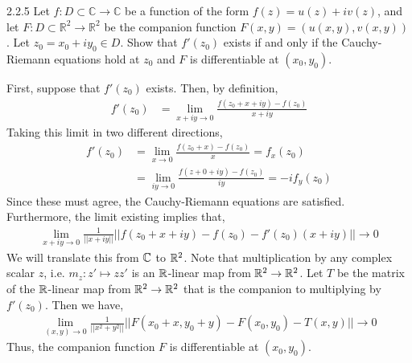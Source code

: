 \documentclass[12pt]{amsart}
\begin{document}
\begin{problem}{2.2.5}
    Let \( f : D \subset \mathbb{C} \to \mathbb{C} \) be a function of the form \( f(z) = u(z) + i v(z) \), and let \( F : D \subset \mathbb{R}^2 \to \mathbb{R}^2 \) be the companion function \( F(x,y) = (u(x,y), v(x,y)) \). Let \( z_0 = x_0 + i y_0 \in D \). Show that \( f'(z_0) \) exists if and only if the Cauchy-Riemann equations hold at \( z_0 \) and \( F \) is differentiable at \( (x_0, y_0) \).
\end{problem}
\begin{solution}
    First, suppose that $f'(z_0)$ exists. Then, by definition, 
    \begin{align*}
        f'(z_0) &= \lim_{x+iy\to 0} \frac{f(z_0+x+iy) -f(z_0)}{x+iy}
    \end{align*}
    Taking this limit in two different directions, 
    \begin{align*}
        f'(z_0) &= \lim_{x \to 0} \frac{f(z_0+x)-f(z_0)}{x} = f_x(z_0) \\
        &= \lim_{iy \to 0} \frac{f(z+0+iy)-f(z_0)}{iy} = -if_y(z_0)
    \end{align*}
    Since these must agree, the Cauchy-Riemann equations are satisfied. 
    Furthermore, the limit existing implies that, 
    \begin{align*}
        \lim_{x+iy \to 0} \frac{1}{||x+iy||} ||f(z_0+x+iy)-f(z_0)-f'(z_0)(x+iy)|| \to 0
    \end{align*}
    We will translate this from $\mathbb C$ to $\mathbb R^2$. Note that multiplication by any complex scalar $z$, i.e. $m_z: z' \mapsto zz'$ is an $\mathbb R$-linear map from $\mathbb R^2 \to \mathbb R^2$. Let $T$ be the matrix of the $\mathbb R$-linear map from $\mathbb R^2 \to \mathbb R^2$ that is the companion to multiplying by $f'(z_0)$. Then we have, 
    \begin{align*}
        \lim_{(x,y) \to 0} \frac{1}{||x^2+y^2||} ||F(x_0+x, y_0+y)-F(x_0, y_0)-T(x,y)|| \to 0
    \end{align*} 
    Thus, the companion function $F$ is differentiable at $(x_0, y_0)$. 


\end{solution}
\end{document}
